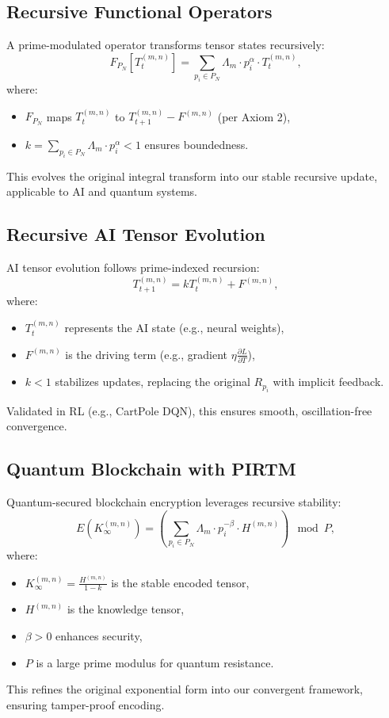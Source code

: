 \documentclass{article}
\theoremstyle{plain}
\begin{document}
\subsection{Recursive Functional Operators}
A prime-modulated operator transforms tensor states recursively:
\begin{equation}
    F_{P_N}[T_t^{(m,n)}] = \sum_{p_i \in P_N} \Lambda_m \cdot p_i^\alpha \cdot T_t^{(m,n)},
\end{equation}
where:
\begin{itemize}
    \item \( F_{P_N} \) maps \( T_t^{(m,n)} \) to \( T_{t+1}^{(m,n)} - F^{(m,n)} \) (per Axiom 2),
    \item \( k = \sum_{p_i \in P_N} \Lambda_m \cdot p_i^\alpha < 1 \) ensures boundedness.
\end{itemize}
This evolves the original integral transform into our stable recursive update, applicable to AI and quantum systems.

\subsection{Recursive AI Tensor Evolution}
AI tensor evolution follows prime-indexed recursion:
\begin{equation}
    T_{t+1}^{(m,n)} = k T_t^{(m,n)} + F^{(m,n)},
\end{equation}
where:
\begin{itemize}
    \item \( T_t^{(m,n)} \) represents the AI state (e.g., neural weights),
    \item \( F^{(m,n)} \) is the driving term (e.g., gradient \( \eta \frac{\partial L}{\partial T} \)),
    \item \( k < 1 \) stabilizes updates, replacing the original \( R_{p_i} \) with implicit feedback.
\end{itemize}
Validated in RL (e.g., CartPole DQN), this ensures smooth, oscillation-free convergence.

\subsection{Quantum Blockchain with PIRTM}
Quantum-secured blockchain encryption leverages recursive stability:
\begin{equation}
    E(K_\infty^{(m,n)}) = \left( \sum_{p_i \in P_N} \Lambda_m \cdot p_i^{-\beta} \cdot H^{(m,n)} \right) \mod P,
\end{equation}
where:
\begin{itemize}
    \item \( K_\infty^{(m,n)} = \frac{H^{(m,n)}}{1 - k} \) is the stable encoded tensor,
    \item \( H^{(m,n)} \) is the knowledge tensor,
    \item \( \beta > 0 \) enhances security,
    \item \( P \) is a large prime modulus for quantum resistance.
\end{itemize}
This refines the original exponential form into our convergent framework, ensuring tamper-proof encoding.
\end{document}
